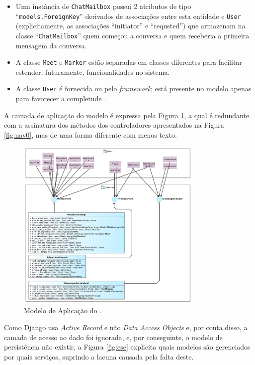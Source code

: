 \begin{itemize}
  \item Uma instância de \texttt{ChatMailbox} possui 2 atributos de tipo ``\texttt{models.ForeignKey}'' derivados de associações entre esta entidade e \texttt{User} (explicitamente, as associações ``initiator'' e ``requsted'') que armazenam na classe ``\texttt{ChatMailbox}'' quem começou a conversa e quem receberia a primeira mensagem da conversa.
  \item A classe \texttt{Meet} e \texttt{Marker} estão separadas em classes diferentes para facilitar estender, futuramente, funcionalidades no sistema.
  \item A classe \texttt{User} é fornecida ou pelo \textit{framework}; está presente no modelo apenas para favorecer a completude .
\end{itemize}

A camada de aplicação do modelo é expressa pela Figura \ref{fig:apl}, a qual é redundante com a assinatura dos métodos dos controladores apresentados na Figura \ref{fig:nav0}, mas de uma forma diferente com menos texto.

\begin{figure}[H]
	\centering
	\includegraphics[width=0.8\textwidth]{figuras/FrameWebApplicationModel.jpg}
	\caption{Modelo de Aplicação do \imprimirtitulo.}
	\label{fig:apl}
\end{figure}

Como Django usa \textit{Active Record} e não \textit{Data Access Objects} e, por conta disso, a camada de acesso ao dado foi ignorada, e, por conseguinte, o modelo de persistência não existir, a Figura \ref{fig:ese} explicita quais modelos são gerenciados por quais serviços, suprindo a lacuna causada pela falta deste.


